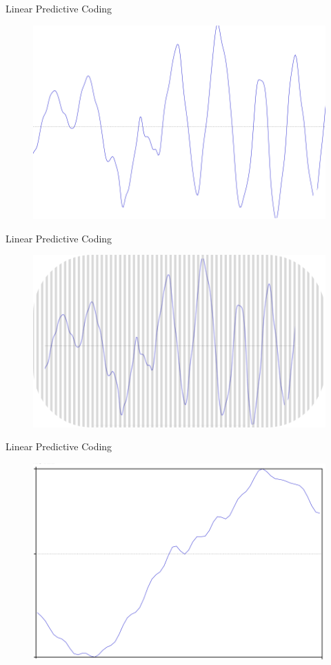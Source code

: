 \documentclass{beamer}
\begin{document}
\begin{frame}
Linear Predictive Coding
\begin{figure}
\includegraphics[scale=0.5]{signal.png}
\end{figure}
\end{frame}
\begin{frame}
Linear Predictive Coding
\begin{figure}
\includegraphics[scale=0.5]{signal_windowed.png}
\end{figure}
\end{frame}
\begin{frame}
Linear Predictive Coding
\begin{figure}
\includegraphics[scale=0.5]{one_window.png}
\end{figure}
\end{frame}
\end{document}
